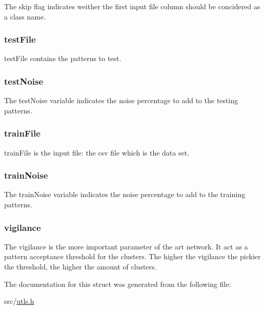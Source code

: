 The skip flag indicates weither the first input file column should be concidered as a class name. \hypertarget{struct_in_param_ab064012679f686113e26114dd2a273f3}{
\subsubsection[{test\-File}]{\setlength{\rightskip}{0pt plus 5cm}test\-File}}\label{struct_in_param_ab064012679f686113e26114dd2a273f3}
test\-File contains the patterns to test. \hypertarget{struct_in_param_a38957505183ab4eba98c9ea699fa286e}{
\subsubsection[{test\-Noise}]{\setlength{\rightskip}{0pt plus 5cm}test\-Noise}}\label{struct_in_param_a38957505183ab4eba98c9ea699fa286e}
The test\-Noise variable indicates the noise percentage to add to the testing patterns. \hypertarget{struct_in_param_adcd81017e33884084e72e477e5462f07}{
\subsubsection[{train\-File}]{\setlength{\rightskip}{0pt plus 5cm}train\-File}}\label{struct_in_param_adcd81017e33884084e72e477e5462f07}
train\-File is the input file\-: the csv file which is the data set. \hypertarget{struct_in_param_aac324529f6880073feb747dc3c6f7add}{
\subsubsection[{train\-Noise}]{\setlength{\rightskip}{0pt plus 5cm}train\-Noise}}\label{struct_in_param_aac324529f6880073feb747dc3c6f7add}
The train\-Noise variable indicates the noise percentage to add to the training patterns. \hypertarget{struct_in_param_a785bde0eb3bff8f83bd6e019449f4a7d}{
\subsubsection[{vigilance}]{\setlength{\rightskip}{0pt plus 5cm}vigilance}}\label{struct_in_param_a785bde0eb3bff8f83bd6e019449f4a7d}
The vigilance is the more important parameter of the art network. It act as a pattern acceptance threshold for the clusters. The higher the vigilance the pickier the threshold, the higher the amount of clusters. 

The documentation for this struct was generated from the following file\-:\begin{DoxyCompactItemize}
\item 
src/\hyperlink{utls_8h}{utls.\-h}\end{DoxyCompactItemize}
